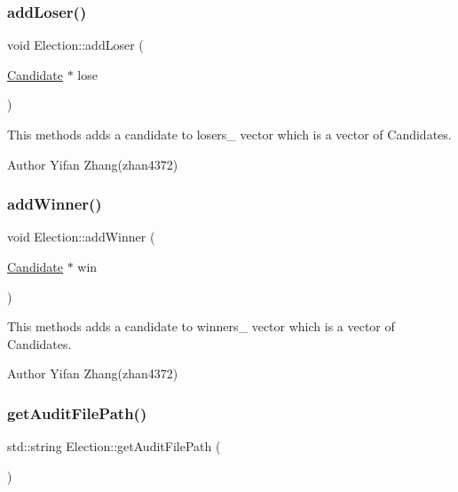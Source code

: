 \subsubsection{\texorpdfstring{add\+Loser()}{addLoser()}}
{\footnotesize\ttfamily void Election\+::add\+Loser (\begin{DoxyParamCaption}\item[{\hyperlink{classCandidate}{Candidate} $\ast$}]{lose }\end{DoxyParamCaption})\hspace{0.3cm}{\ttfamily [protected]}}

This methods adds a candidate to losers\+\_\+ vector which is a vector of Candidates. \begin{DoxyAuthor}{Author}
Yifan Zhang(zhan4372) 
\end{DoxyAuthor}
\mbox{\label{classElection_a6b6bac6b3c0789a311f1daf8e9d4a31c}} 
\subsubsection{\texorpdfstring{add\+Winner()}{addWinner()}}
{\footnotesize\ttfamily void Election\+::add\+Winner (\begin{DoxyParamCaption}\item[{\hyperlink{classCandidate}{Candidate} $\ast$}]{win }\end{DoxyParamCaption})\hspace{0.3cm}{\ttfamily [protected]}}

This methods adds a candidate to winners\+\_\+ vector which is a vector of Candidates. \begin{DoxyAuthor}{Author}
Yifan Zhang(zhan4372) 
\end{DoxyAuthor}
\mbox{\label{classElection_ae55fafa9a82cca3c20b2343fed3f7250}} 
\subsubsection{\texorpdfstring{get\+Audit\+File\+Path()}{getAuditFilePath()}}
{\footnotesize\ttfamily std\+::string Election\+::get\+Audit\+File\+Path (\begin{DoxyParamCaption}{ }\end{DoxyParamCaption})}

